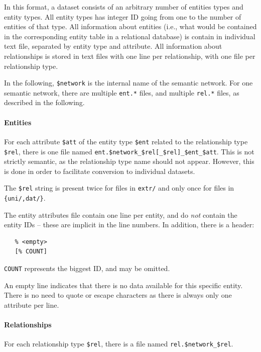 \documentclass{article}
\begin{document}
In this format, a dataset consists of an arbitrary number of entities
types and entity types.  All entity types has integer ID going from one
to the number of entities of that type.  All information about entities
(i.e., what would be contained in the corresponding entity table in a
relational database) is contain in individual text file, separated by
entity type and attribute.  All information about relationships is
stored in text files with one line per relationship, with one file per
relationship type.  

In the following, \texttt{\$network} is the internal name of the semantic
network. 
For one semantic network, there are multiple \texttt{ent.*} files, and
multiple \texttt{rel.*} files, as described in the following. 

\paragraph{Entities}

For each attribute \texttt{\$att} of the entity type \texttt{\$ent}
related to the relationship type \texttt{\$rel}, there is one file named 
\texttt{ent.\$network\_\$rel[\_\$rel]\_\$ent\_\$att}.  This is not strictly
semantic, as the relationship type name should not appear. However, this
is done in order to facilitate conversion to individual datasets.

The \texttt{\$rel} string is present twice for files in \texttt{extr/} and only once for files in \texttt{\{uni/,dat/\}}.

The entity attributes file contain one line per entity, and do
\emph{not} contain the entity IDs -- these are implicit in the line
numbers.  In addition, there is a header:

\begin{verbatim}
   % <empty>
   [% COUNT]
\end{verbatim}

\texttt{COUNT} represents the biggest ID, and may be omitted.

An empty line indicates that there is no data available for this specific entity.
There is no need to quote or escape characters as there is always only one attribute per line.

\paragraph{Relationships}

For each relationship type \texttt{\$rel}, there is a file named
\texttt{rel.\$network\_\$rel}. 
\end{document}
